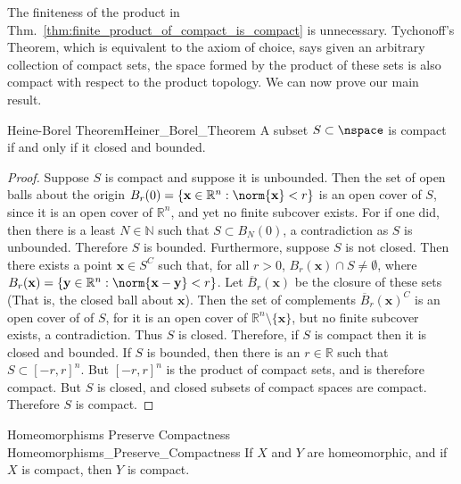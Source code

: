 \documentclass{book}                                                           %
\begin{document}
            The finiteness of the product in
            Thm.~\ref{thm:finite_product_of_compact_is_compact} is unnecessary.
            Tychonoff's Theorem, which is equivalent to the axiom of choice, says
            given an arbitrary collection of compact sets, the space formed by the
            product of these sets is also compact with respect to the product
            topology. We can now prove our main result.
            \begin{ftheorem}{Heine-Borel Theorem}{Heiner_Borel_Theorem}
                A subset $S\subset\nspace$ is compact if
                and only if it closed and bounded.
            \end{ftheorem}
            \begin{proof}
                Suppose $S$ is compact and suppose it is unbounded. Then the
                set of open balls about the origin
                $B_{r}(0)=\{\mathbf{x}\in\mathbb{R}^{n}:\norm{\mathbf{x}}<r\}$
                is an open cover of $S$, since it is an open cover of
                $\mathbb{R}^{n}$, and yet no finite subcover exists. For if
                one did, then there is a least $N\in\mathbb{N}$ such that
                $S\subset{B_{N}(0)}$, a contradiction as $S$ is unbounded.
                Therefore $S$ is bounded. Furthermore, suppose $S$ is
                not closed. Then there exists a point $\mathbf{x}\in{S^{C}}$
                such that, for all $r>0$,
                $B_{r}(\mathbf{x})\cap{S}\ne\emptyset$, where
                $B_{r}(\mathbf{x})=\{\mathbf{y}\in\mathbb{R}^{n}:%
                 \norm{\mathbf{x}-\mathbf{y}}<r\}$.
                Let $\overline{B}_{r}(\mathbf{x})$ be the closure of these sets
                (That is, the closed ball about $\mathbf{x}$). Then the set of
                complements $\overline{B}_{r}(\mathbf{x})^{C}$ is an open cover
                of of $S$, for it is an open cover of
                $\mathbb{R}^{n}\setminus\{\mathbf{x}\}$, but no finite subcover
                exists, a contradiction. Thus $S$ is closed. Therefore, if $S$
                is compact then it is closed and bounded. If $S$ is bounded,
                then there is an $r\in\mathbb{R}$ such that
                $S\subset[-r,r]^{n}$. But $[-r,r]^{n}$ is the product of compact
                sets, and is therefore compact. But $S$ is closed, and closed
                subsets of compact spaces are compact. Therefore $S$ is compact.
            \end{proof}
            \begin{ltheorem}{Homeomorphisms Preserve Compactness}
                            {Homeomorphisms_Preserve_Compactness}
                If $X$ and $Y$ are homeomorphic, and if $X$ is compact,
                then $Y$ is compact.
            \end{ltheorem}
\end{document}

